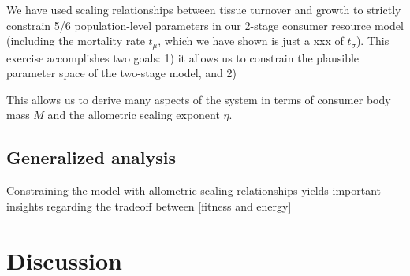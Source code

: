 \documentclass[12pt,english]{article}
\begin{document}
\begin{spacing}{1.9}
We have used scaling relationships between tissue turnover and growth to strictly constrain 5/6 population-level parameters in our 2-stage consumer resource model (including the mortality rate $t_\mu$, which we have shown is just a xxx of $t_\sigma$).
This exercise accomplishes two goals:
1) it allows us to constrain the plausible parameter space of the two-stage model, and 
2) 

This allows us to derive many aspects of the system in terms of consumer body mass $M$ and the allometric scaling exponent $\eta$.



\subsection{Generalized analysis}
Constraining the model with allometric scaling relationships yields important insights regarding the tradeoff between [fitness and energy]





\section{Discussion}

%
%
%
%
%
%




\end{spacing}
\end{document}
